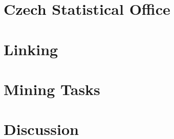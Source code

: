






\section{Czech Statistical Office}


\section{Linking}







\section{Mining Tasks}


\section{Discussion}